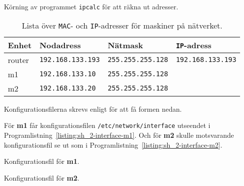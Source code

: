 \begin{listing}[H]
  \caption{Körning av programmet \texttt{ipcalc} för att räkna ut adresser.}
  \label{listing:sh_2-ipcalc}
\end{listing}


\begin{table}[]
  \centering
  \caption{Lista över \texttt{MAC}- och \texttt{IP}-adresser för maskiner på
           nätverket.}
  \label{table:interface-config}
  \begin{tabular}{@{}llll@{}}
    \toprule
    Enhet  & Nodadress                & Nätmask                  & \texttt{IP}-adress          \\ \midrule
    router & \texttt{192.168.133.193} & \texttt{255.255.255.128} & \texttt{192.168.133.193} \\
    m1     & \texttt{192.168.133.10}  & \texttt{255.255.255.128} & \texttt{}        \\
    m2     & \texttt{192.168.133.20}  & \texttt{255.255.255.128} & \texttt{}      \\ \bottomrule
  \end{tabular}
\end{table}


Konfigurationsfilerna skrevs enligt \cite{debian:network} för att få formen
nedan.

För \textbf{m1} får konfigurationsfilen \texttt{/etc/network/interface}
utseendet i Programlistning~\ref{listing:sh_2-interface-m1}.  Och för
\textbf{m2} skulle motsvarande konfigurationsfil se ut som i
Programlistning~\ref{listing:sh_2-interface-m2}.


\begin{listing}[H]
  \caption{Konfigurationsfil för \textbf{m1}.}
  \label{listing:sh_2-interface-m1}
\end{listing}

\begin{listing}[H]
  \caption{Konfigurationsfil för \textbf{m2}.}
  \label{listing:sh_2-interface-m2}
\end{listing}
